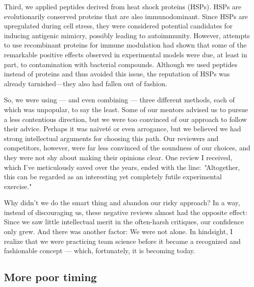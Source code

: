 \documentclass[authordate, editorial, issue]{jote-new-article}
\begin{document}
	Third, we applied peptides derived from heat shock proteins (HSPs). HSPs are evolutionarily conserved proteins that are also immunodominant. Since HSPs are upregulated during cell stress, they were considered potential candidates for inducing antigenic mimicry, possibly leading to autoimmunity. However, attempts to use recombinant proteins for immune modulation had shown that some of the remarkable positive effects observed in experimental models were due, at least in part, to contamination with bacterial compounds. Although we used peptides instead of proteins and thus avoided this issue, the reputation of HSPs was already tarnished—they also had fallen out of fashion.







	So, we were using — and even combining — three different methods, each of which was unpopular, to say the least. Some of our mentors advised us to pursue a less contentious direction, but we were too convinced of our approach to follow their advice. Perhaps it was naïveté or even arrogance, but we believed we had strong intellectual arguments for choosing this path. Our reviewers and competitors, however, were far less convinced of the soundness of our choices, and they were not shy about making their opinions clear. One review I received, which I've meticulously saved over the years, ended with the line: \emph{"}Altogether, this can be regarded as an interesting yet completely futile experimental exercise\emph{.}"\emph{ }







	Why didn't we do the smart thing and abandon our risky approach? In a way, instead of discouraging us, these negative reviews almost had the opposite effect: Since we saw little intellectual merit in the often-harsh critiques, our confidence only grew. And there was another factor: We were not alone. In hindsight, I realize that we were practicing team science before it became a recognized and fashionable concept — which, fortunately, it is becoming today.



	\subsection{More poor timing}
\end{document}
